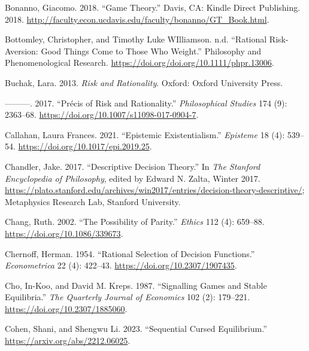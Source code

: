 \documentclass[
  12pt,
  letterpaper,
  DIV=11,
  numbers=noendperiod]{scrreprt}
\newlength{\cslhangindent}
\newlength{\cslentryspacingunit} %
\newenvironment{CSLReferences}[2] %
 {%
  \setlength{\parindent}{0pt}
  \ifodd #1
  \let\oldpar\par
  \def\par{\hangindent=\cslhangindent\oldpar}
  \fi
  \setlength{\parskip}{#2\cslentryspacingunit}
 }%
 {}
\begin{document}
\begin{CSLReferences}{1}{0}
\leavevmode{}%
Bonanno, Giacomo. 2018. {``Game Theory.''} Davis, CA: Kindle Direct
Publishing. 2018.
\url{http://faculty.econ.ucdavis.edu/faculty/bonanno/GT_Book.html}.

\leavevmode{}%
Bottomley, Christopher, and Timothy Luke WIlliamson. n.d. {``Rational
Risk-Aversion: Good Things Come to Those Who Weight.''} {P}hilosophy and
{P}henomenological {R}esearch.
\url{https://doi.org/doi.org/10.1111/phpr.13006}.

\leavevmode{}%
Buchak, Lara. 2013. \emph{Risk and Rationality}. Oxford: Oxford
University Press.

\leavevmode{}%
---------. 2017. {``Pr{é}cis of Risk and Rationality.''}
\emph{Philosophical Studies} 174 (9): 2363--68.
\url{https://doi.org/10.1007/s11098-017-0904-7}.

\leavevmode{}%
Callahan, Laura Frances. 2021. {``Epistemic Existentialism.''}
\emph{Episteme} 18 (4): 539--54.
\url{https://doi.org/10.1017/epi.2019.25}.

\leavevmode{}%
Chandler, Jake. 2017. {``{Descriptive Decision Theory}.''} In \emph{The
{Stanford} Encyclopedia of Philosophy}, edited by Edward N. Zalta,
{W}inter 2017.
\url{https://plato.stanford.edu/archives/win2017/entries/decision-theory-descriptive/};
Metaphysics Research Lab, Stanford University.

\leavevmode{}%
Chang, Ruth. 2002. {``The Possibility of Parity.''} \emph{Ethics} 112
(4): 659--88. \url{https://doi.org/10.1086/339673}.

\leavevmode{}%
Chernoff, Herman. 1954. {``Rational Selection of Decision Functions.''}
\emph{Econometrica} 22 (4): 422--43.
\url{https://doi.org/10.2307/1907435}.

\leavevmode{}%
Cho, In-Koo, and David M. Kreps. 1987. {``Signalling Games and Stable
Equilibria.''} \emph{The Quarterly Journal of Economics} 102 (2):
179--221. \url{https://doi.org/10.2307/1885060}.

\leavevmode{}%
Cohen, Shani, and Shengwu Li. 2023. {``Sequential Cursed Equilibrium.''}
\url{https://arxiv.org/abs/2212.06025}.


\end{CSLReferences}
\end{document}
